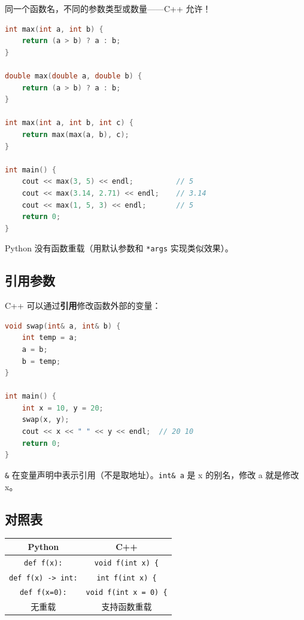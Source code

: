 \documentclass[a4paper,12pt]{ctexart}
\begin{document}
同一个函数名，不同的参数类型或数量——C++ 允许！

\begin{lstlisting}[language=C++]
int max(int a, int b) {
    return (a > b) ? a : b;
}

double max(double a, double b) {
    return (a > b) ? a : b;
}

int max(int a, int b, int c) {
    return max(max(a, b), c);
}

int main() {
    cout << max(3, 5) << endl;          // 5
    cout << max(3.14, 2.71) << endl;    // 3.14
    cout << max(1, 5, 3) << endl;       // 5
    return 0;
}
\end{lstlisting}

Python 没有函数重载（用默认参数和 \texttt{*args} 实现类似效果）。

\subsection*{引用参数}

C++ 可以通过\textbf{引用}修改函数外部的变量：

\begin{lstlisting}[language=C++]
void swap(int& a, int& b) {
    int temp = a;
    a = b;
    b = temp;
}

int main() {
    int x = 10, y = 20;
    swap(x, y);
    cout << x << " " << y << endl;  // 20 10
    return 0;
}
\end{lstlisting}

\texttt{\&} 在变量声明中表示引用（不是取地址）。\texttt{int\& a} 是 x 的别名，修改 a 就是修改 x。

\subsection*{对照表}

\begin{center}
\begin{tabular}{|c|c|}
\hline
\textbf{Python} & \textbf{C++} \\ \hline
\texttt{def f(x):} & \texttt{void f(int x) \{} \\ \hline
\texttt{def f(x) -> int:} & \texttt{int f(int x) \{} \\ \hline
\texttt{def f(x=0):} & \texttt{void f(int x = 0) \{} \\ \hline
无重载 & 支持函数重载 \\ \hline
\end{tabular}
\end{center}
\end{document}
